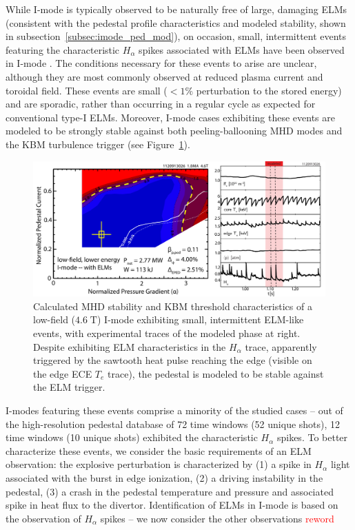 \documentclass[12pt,floatfix,showpacs]{revtex4-1}
\newcommand{\note}[1]{\textcolor{red}{#1}}
\begin{document}
While I-mode is typically observed to be naturally free of large, damaging ELMs (consistent with the pedestal profile characteristics and modeled stability, shown in subsection~\ref{subsec:imode_ped_mod}), on occasion, small, intermittent events featuring the characteristic $H_\alpha$ spikes associated with ELMs have been observed in I-mode \cite{Whyte2010,Walk2014}.  
The conditions necessary for these events to arise are unclear, although they are most commonly observed at reduced plasma current and toroidal field.  
These events are small ($<1\%$ perturbation to the stored energy) and are sporadic, rather than occurring in a regular cycle as expected for conventional type-I ELMs.  
Moreover, I-mode cases exhibiting these events are modeled to be strongly stable against both peeling-ballooning MHD modes and the KBM turbulence trigger (see Figure~\ref{fig:elite_1120913026}).

\begin{figure}[ht]
 \includegraphics[width=\textwidth]{pdfgraphics/1120913026_ELITE_stitch_v3.pdf}
 \caption{Calculated MHD stability and KBM threshold characteristics of a low-field ($4.6\;\mbox{T}$) I-mode exhibiting small, intermittent ELM-like events, with experimental traces of the modeled phase at right.  Despite exhibiting ELM characteristics in the $H_\alpha$ trace, apparently triggered by the sawtooth heat pulse reaching the edge (visible on the edge ECE $T_e$ trace), the pedestal is modeled to be stable against the ELM trigger.}
 \label{fig:elite_1120913026}
\end{figure}

I-modes featuring these events comprise a minority of the studied cases -- out of the high-resolution pedestal database of 72 time windows (52 unique shots), 12 time windows (10 unique shots) exhibited the characteristic $H_\alpha$ spikes.
To better characterize these events, we consider the basic requirements of an ELM observation: the explosive perturbation is characterized by (1) a spike in $H_\alpha$ light associated with the burst in edge ionization, (2) a driving instability in the pedestal, (3) a crash in the pedestal temperature and pressure and associated spike in heat flux to the divertor.  
Identification of ELMs in I-mode is based on the observation of $H_\alpha$ spikes -- we now consider the other observations \note{reword}
\end{document}
